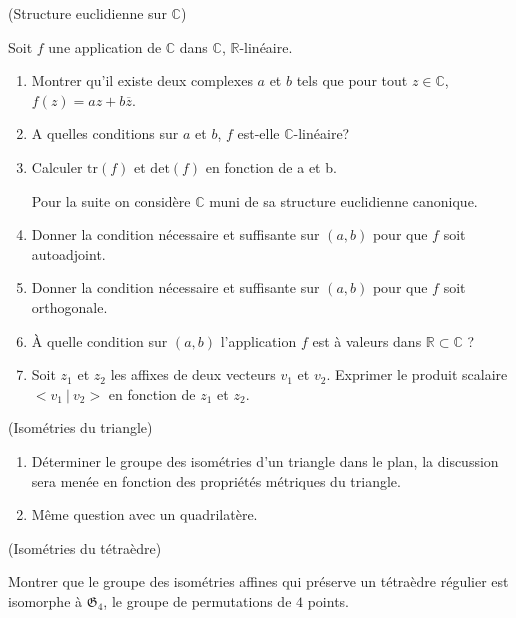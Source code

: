 \documentclass[a4paper,12pt,reqno]{amsart}
\begin{document}
\begin{exo} (Structure euclidienne sur $\mathbb{C}$)

  Soit $f$ une application de $\mathbb{C}$ dans $\mathbb{C}$, $\mathbb{R}$-linéaire.
  \begin{enumerate}
    \item Montrer qu'il existe deux complexes $a$ et $b$ tels que pour tout $z\in\mathbb{C}$, $f(z)=az+b\overline{z}$.
    \item A quelles conditions sur $a$ et $b$, $f$ est-elle $\mathbb{C}$-linéaire?
    \item Calculer $\mathrm{tr}(f)$ et $\mathrm{det}(f)$ en fonction de a et b.

    \begin{convention}
      Pour la suite on considère $\mathbb{C}$ muni de sa structure euclidienne canonique.
    \end{convention}

    \item Donner la condition nécessaire et suffisante sur $(a,b)$ pour que $f$ soit autoadjoint.
    \item Donner la condition nécessaire et suffisante sur $(a,b)$ pour que $f$ soit orthogonale.
    \item À quelle condition sur $(a,b)$ l'application $f$ est à valeurs dans $\mathbb{R} \subset \mathbb{C}$ ?
    \item Soit $z_{1}$ et $z_{2}$ les affixes de deux vecteurs $v_{1}$ et $v_{2}$.\newline
    Exprimer le produit scalaire $<v_{1} ~|~ v_{2}>$ en fonction de $z_{1}$ et $z_{2}$.
  \end{enumerate}
\end{exo}

\begin{exo} (Isométries du triangle)
  \begin{enumerate}
    \item Déterminer le groupe des isométries d'un triangle dans le plan, la discussion sera menée en fonction des propriétés métriques du triangle.
    \item Même question avec un quadrilatère.
  \end{enumerate}
\end{exo}

\begin{exo} (Isométries du tétraèdre)

    Montrer que le groupe des isométries affines qui préserve un tétraèdre régulier est isomorphe à $\mathfrak{G}_{4}$, le groupe de permutations de $4$ points.
\end{exo}
\end{document}
